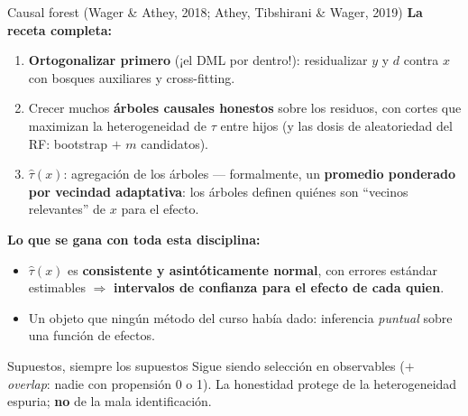 \documentclass{beamer}
\newcommand{\1}{\mathbb{I}}
\begin{document}
\begin{frame}{Causal forest (Wager \& Athey, 2018; Athey, Tibshirani \& Wager, 2019)}
\small
\textbf{La receta completa:}
\begin{enumerate}\itemsep4pt
  \item \textbf{Ortogonalizar primero} (¡el DML por dentro!): residualizar $y$ y $d$ contra $x$ con bosques auxiliares y cross-fitting.
  \item Crecer muchos \textbf{árboles causales honestos} sobre los residuos, con cortes que maximizan la heterogeneidad de $\tau$ entre hijos (y las dosis de aleatoriedad del RF: bootstrap $+$ $m$ candidatos).
  \item $\hat{\tau}(x)$: agregación de los árboles --- formalmente, un \textbf{promedio ponderado por vecindad adaptativa}: los árboles definen quiénes son ``vecinos relevantes'' de $x$ para el efecto.
\end{enumerate}
\pause

\vspace{0.15cm}
\textbf{Lo que se gana con toda esta disciplina:}
\begin{itemize}\itemsep4pt
  \item $\hat{\tau}(x)$ es \textbf{consistente y asintóticamente normal}, con errores estándar estimables $\Rightarrow$ \textbf{intervalos de confianza para el efecto de cada quien}.
  \item Un objeto que ningún método del curso había dado: inferencia \emph{puntual} sobre una función de efectos. \pause
\end{itemize}

\begin{block}{Supuestos, siempre los supuestos}
Sigue siendo selección en observables ($+$ \emph{overlap}: nadie con propensión 0 o 1). La honestidad protege de la heterogeneidad espuria; \textbf{no} de la mala identificación.
\end{block}
\end{frame}
\end{document}
